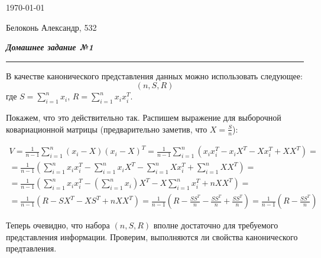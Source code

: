 \documentclass[12pt,a4paper]{article}
\begin{document}
\begin{flushright}
	\today{}
	
	Белоконь Александр, 532
\end{flushright}

\textbf{\textit{Домашнее задание №1}}
\vskip 5pt
\hrule
\vskip 15pt

В качестве канонического представления данных можно использовать следующее:
\begin{equation}
	\boxed{(n, S, R)}
\end{equation}
где $S = \sum_{i = 1}^{n}x_i$, $R = \sum_{i = 1}^{n}x_ix_i^T$.

Покажем, что это действительно так. Распишем выражение для выборочной ковариационной матрицы (предварительно заметив, что $X = \frac{S}{n}$):

\begin{equation}
	\label{main}
	\begin{split}
		V = \frac{1}{n-1}\sum_{i = 1}^{n}(x_i - X)(x_i - X)^T = \frac{1}{n-1}\sum_{i = 1}^{n}(x_ix_i^T - x_iX^T - Xx_i^T + XX^T) = \\ = \frac{1}{n-1}\left(\sum_{i = 1}^{n}x_ix_i^T - \sum_{i = 1}^{n}x_iX^T - \sum_{i = 1}^{n}Xx_i^T + \sum_{i = 1}^{n}XX^T\right) = \\ = \frac{1}{n-1}\left(\sum_{i = 1}^{n}x_ix_i^T - \left(\sum_{i = 1}^{n}x_i\right)X^T - X\sum_{i = 1}^{n}x_i^T + nXX^T\right) = \\ = \frac{1}{n-1}\left(R - SX^T - XS^T + nXX^T\right) = \frac{1}{n-1}\left(R - \frac{SS^T}{n} - \frac{SS^T}{n} + \frac{SS^T}{n}\right) = \frac{1}{n-1}\left(R - \frac{SS^T}{n}\right)
	\end{split}
\end{equation}

Теперь очевидно, что набора $(n, S, R)$ вполне достаточно для требуемого представления информации. Проверим, выполняются ли свойства канонического предтавления.
\end{document}
